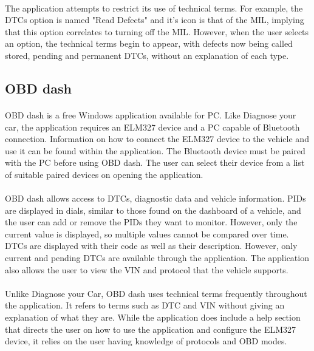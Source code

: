 		\paragraph{}{
		The application attempts to restrict its use of technical terms. For example, the DTCs option is named "Read Defects" and it's icon is that of the MIL, implying that this option correlates to turning off the MIL. However, when the user selects an option, the technical terms begin to appear, with defects now being called stored, pending and permanent DTCs, without an explanation of each type. 
		}		
	\subsection{OBD dash}
		\paragraph{}{
		OBD dash is a free Windows application available for PC. Like Diagnose your car, the application requires an ELM327 device and a PC capable of Bluetooth connection. Information on how to connect the ELM327 device to the vehicle and use it can be found within the application. The Bluetooth device must be paired with the PC before using OBD dash. The user can select their device from a list of suitable paired devices on opening the application.	
		}
		\paragraph{}{
		OBD dash allows access to DTCs, diagnostic data and vehicle information. PIDs are displayed in dials, similar to those found on the dashboard of a vehicle, and the user can add or remove the PIDs they want to monitor. However, only the current value is displayed, so multiple values cannot be compared over time. DTCs are displayed with their code as well as their description. However, only current and pending DTCs are available through the application. The application also allows the user to view the VIN and protocol that the vehicle supports.
		}
		\paragraph{}{
		Unlike Diagnose your Car, OBD dash uses technical terms frequently throughout the application. It refers to terms such as DTC and VIN without giving an explanation of what they are. While the application does include a help section that directs the user on how to use the application and configure the ELM327 device, it relies on the user having knowledge of protocols and OBD modes.
		}
		
